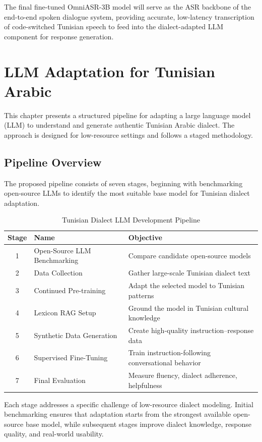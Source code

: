\documentclass[12pt,a4paper]{report}
\begin{document}
The final fine-tuned OmniASR-3B model will serve as the ASR backbone of the end-to-end
spoken dialogue system, providing accurate, low-latency transcription of code-switched
Tunisian speech to feed into the dialect-adapted LLM component for response generation.
\chapter{LLM Adaptation for Tunisian Arabic}

This chapter presents a structured pipeline for adapting a large language model (LLM)
to understand and generate authentic Tunisian Arabic dialect. The approach is designed
for low-resource settings and follows a staged methodology.

\section{Pipeline Overview}

The proposed pipeline consists of seven stages, beginning with benchmarking open-source LLMs to identify the most suitable base model for Tunisian dialect adaptation.
\begin{table}[H]
\centering
\begin{tabular}{c l p{10cm}}
\toprule
\textbf{Stage} & \textbf{Name} & \textbf{Objective} \\
\midrule
1 & Open-Source LLM Benchmarking & Compare candidate open-source models \\
2 & Data Collection & Gather large-scale Tunisian dialect text \\
3 & Continued Pre-training & Adapt the selected model to Tunisian patterns \\
4 & Lexicon RAG Setup & Ground the model in Tunisian cultural knowledge \\
5 & Synthetic Data Generation & Create high-quality instruction--response data \\
6 & Supervised Fine-Tuning & Train instruction-following conversational behavior \\
7 & Final Evaluation & Measure fluency, dialect adherence, helpfulness \\
\bottomrule
\end{tabular}
\caption{Tunisian Dialect LLM Development Pipeline}
\end{table}
Each stage addresses a specific challenge of low-resource dialect modeling. Initial benchmarking ensures that adaptation starts from the strongest available open-source base model, while subsequent stages improve dialect knowledge, response quality, and real-world usability.
\end{document}
